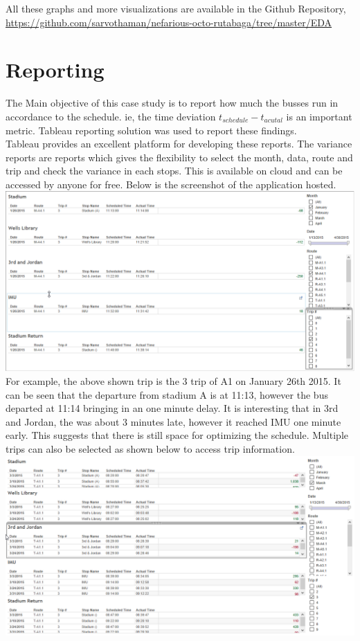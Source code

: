 \documentclass[12pt]{article}
\begin{document}
All these graphs and more visualizations are available in the Github Repository, \url{https://github.com/sarvothaman/nefarious-octo-rutabaga/tree/master/EDA}
\section{Reporting}
The Main objective of this case study is to report how much the busses run in accordance to the schedule. ie, the time deviation $t_{schedule}-t_{acutal}$ is an important metric. Tableau reporting solution was used to report these findings. \\
Tableau provides an excellent platform for developing these reports. The variance reports are reports which gives the flexibility to select the month, data, route and trip and check the variance in each stops. This is available on cloud and can be accessed by anyone for free. Below is the screenshot of the application hosted.\\
\includegraphics[scale=0.55]{resources/tableau4}\\[1cm] 
For example, the above shown trip is the 3 trip of A1 on January 26th 2015. It can be seen that the departure from stadium A is at 11:13, however the bus departed at 11:14 bringing in an one minute delay. It is interesting that in 3rd and Jordan, the was about 3 minutes late, however it reached IMU one minute early. This suggests that there is still space for optimizing the schedule. Multiple trips can also be selected as shown below to access trip information.
\includegraphics[scale=0.55]{resources/tableau5}\\[1cm] 
\end{document}
